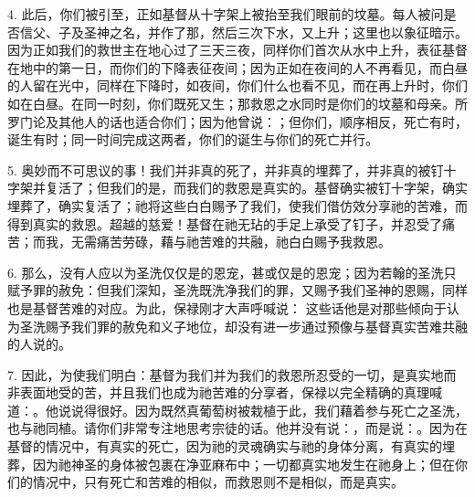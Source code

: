 4. 此后，你们被引至，正如基督从十字架上被抬至我们眼前的坟墓。每人被问是否信父、子及圣神之名，并作了那，然后三次下水，又上升；这里也以象征暗示。因为正如我们的救世主在地心过了三天三夜，同样你们首次从水中上升，表征基督在地中的第一日，而你们的下降表征夜间；因为正如在夜间的人不再看见，而白昼的人留在光中，同样在下降时，如夜间，你们什么也看不见，而在再上升时，你们如在白昼。在同一时刻，你们既死又生；那救恩之水同时是你们的坟墓和母亲。所罗门论及其他人的话也适合你们；因为他曾说：；但你们，顺序相反，死亡有时，诞生有时；同一时间完成这两者，你们的诞生与你们的死亡并行。\par

5. 奥妙而不可思议的事！我们并非真的死了，并非真的埋葬了，并非真的被钉十字架并复活了；但我们的是，而我们的救恩是真实的。基督确实被钉十字架，确实埋葬了，确实复活了；祂将这些白白赐予了我们，使我们借仿效分享祂的苦难，而得到真实的救恩。超越的慈爱！基督在祂无玷的手足上承受了钉子，并忍受了痛苦；而我，无需痛苦劳碌，藉与祂苦难的共融，祂白白赐予我救恩。\par

6. 那么，没有人应以为圣洗仅仅是的恩宠，甚或仅是的恩宠；因为若翰的圣洗只赋予罪的赦免：但我们深知，圣洗既洗净我们的罪，又赐予我们圣神的恩赐，同样也是基督苦难的对应。为此，保禄刚才大声呼喊说： 这些话他是对那些倾向于认为圣洗赐予我们罪的赦免和义子地位，却没有进一步通过预像与基督真实苦难共融的人说的。\par

7. 因此，为使我们明白：基督为我们并为我们的救恩所忍受的一切，是真实地而非表面地受的苦，并且我们也成为祂苦难的分享者，保禄以完全精确的真理喊道：。他说说得很好。因为既然真葡萄树被栽植于此，我们藉着参与死亡之圣洗，也与祂同植。请你们非常专注地思考宗徒的话。他并没有说：，而是说：。因为在基督的情况中，有真实的死亡，因为祂的灵魂确实与祂的身体分离，有真实的埋葬，因为祂神圣的身体被包裹在净亚麻布中；一切都真实地发生在祂身上；但在你们的情况中，只有死亡和苦难的相似，而救恩则不是相似，而是真实。\par

